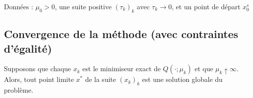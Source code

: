 \begin{algorithm}[H]
    \caption{Méthode de pénalité quadratique}
    \SetAlgoLined
    Données : $\mu_0 > 0$, une suite positive $(\tau_k)_k$ avec $\tau_k \to 0$, et un point de départ $x_0^s$\;
\end{algorithm}

\subsection{Convergence de la méthode (avec contraintes d'égalité)}

\begin{theoreme}
    Supposons que chaque $x_k$ est le minimiseur exact de $Q(\cdot; \mu_k)$ et que $\mu_k \uparrow \infty$.
    Alors, tout point limite $x^*$ de la suite $(x_k)_k$ est une solution globale du problème.
\end{theoreme}

